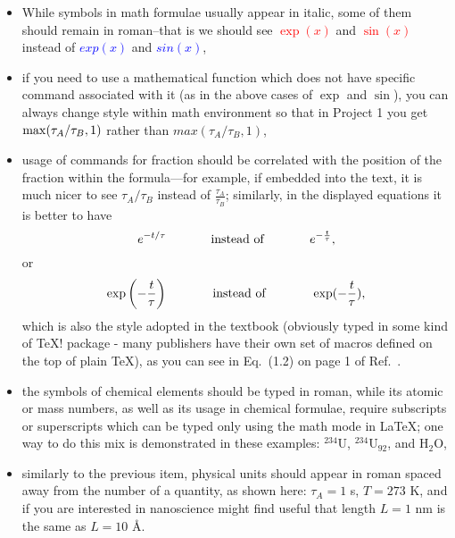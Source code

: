 \documentclass[12pt]{article}
\begin{document}
\begin{itemize}

\item While symbols in math formulae usually appear in italic, some of them should remain in roman--that is we should see \textcolor{red}{$\exp(x)$} and \textcolor{red}{$\sin(x)$} instead of \textcolor{blue}{$exp(x)$} and \textcolor{blue}{$sin(x)$},

\item if you need to use a mathematical function which does not have specific command associated with it (as in the above cases of $\exp$ and $\sin$), you can always change style within math environment so that in Project 1 you get ${\rm max}(\tau_A/\tau_B,1)$ rather than $max(\tau_A/\tau_B,1)$,

\item usage of commands for fraction should be correlated with the position of the fraction within the formula---for example, if embedded into the text, it is much nicer to see $\tau_A/\tau_B$ instead of $\frac{\tau_A}{\tau_B}$; similarly, in the displayed equations it is better to have 
\begin{equation} \label{eq:exp_function}
e^{-t/\tau} \hspace {0.5in} {\rm instead \ of} \hspace{0.5in} e^{-\frac{t}{\tau}},
\end{equation}
or
\begin{equation}
\exp \left(-\frac{t}{\tau} \right) \hspace {0.5in} {\rm instead \ of} \hspace{0.5in} \exp(-\frac{t}{\tau}),
\end{equation}
which is also the style adopted in the textbook (obviously typed in some kind of \TeX! package - many publishers have their own set of macros defined on the top of plain \TeX), as you can see in Eq.~(1.2) on page 1 of Ref.~\cite{giordano}.

\item the symbols of chemical elements should be typed in roman, while its atomic or mass numbers, as well 
as its usage in chemical formulae, require subscripts or superscripts which can be typed only using the math mode in \LaTeX; one way to do this mix is demonstrated in these examples: $^{234}$U,  $^{234}$U$_{92}$, and H$_2$O,

\item similarly to the previous item, physical units should appear in roman spaced away from the number of a quantity, as shown here: $\tau_A=1$ s, $T=273$ K, and if you are interested in nanoscience might find useful that length $L=1$ nm is the same as $L=10$ \AA{}.


\end{itemize}
\end{document}
